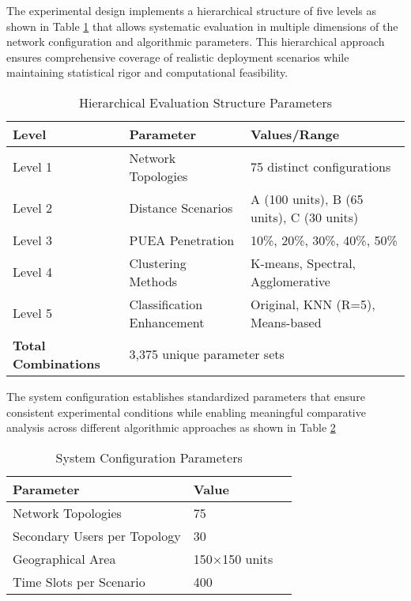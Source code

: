 The experimental design implements a hierarchical structure of five levels as shown in Table \ref{tab:hierarchy} that allows systematic evaluation in multiple dimensions of the network configuration and algorithmic parameters. This hierarchical approach ensures comprehensive coverage of realistic deployment scenarios while maintaining statistical rigor and computational feasibility.
 
\begin{table}[h]
\centering
\caption{Hierarchical Evaluation Structure Parameters}
\label{tab:hierarchy}
\begin{tabular}{|l|l|l|}
\hline
\textbf{Level} & \textbf{Parameter} & \textbf{Values/Range} \\
\hline
Level 1 & Network Topologies & 75 distinct configurations \\
Level 2 & Distance Scenarios & A (100 units), B (65 units), C (30 units) \\
Level 3 & PUEA Penetration & 10\%, 20\%, 30\%, 40\%, 50\% \\
Level 4 & Clustering Methods & K-means, Spectral, Agglomerative \\
Level 5 & Classification Enhancement & Original, KNN (R=5), Means-based \\
\hline
\textbf{Total Combinations} & \multicolumn{2}{|l|}{3,375 unique parameter sets} \\
\hline
\end{tabular}
\end{table}

The system configuration establishes standardized parameters that ensure consistent experimental conditions while enabling meaningful comparative analysis across different algorithmic approaches as shown in Table \ref{tab:system_config}

\begin{table}[h]
\centering
\caption{System Configuration Parameters}
\label{tab:system_config}
\begin{tabular}{|l|l|l|}
\hline
\textbf{Parameter} & \textbf{Value} \\
\hline
Network Topologies & 75 \\
Secondary Users per Topology & 30  \\
Geographical Area & 150×150 units \\
Time Slots per Scenario & 400  \\
\hline
\end{tabular}
\end{table}

